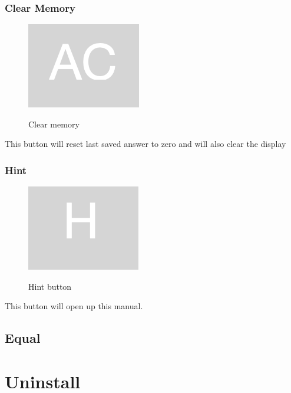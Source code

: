 \documentclass[11pt, a4paper]{article}
\begin{document}
    \subsubsection{Clear Memory}
    \label{subsubsec:clearmemory}

    \begin{figure}[h]
        \caption{Clear memory}
        \includegraphics[scale = 0.2]{clear_memory}
        \centering
        \label{fig:c}
    \end{figure}
    This button will reset last saved answer to zero and will also clear the display

    \subsubsection[scale = 0.2]{Hint}
    \label{subsubsec:hint}


    \begin{figure}[h]
        \caption{Hint button}
        \includegraphics[scale = 0.2]{hint}
        \centering
        \label{fig:h}
    \end{figure}

    This button will open up this manual.

    \newpage

    \subsection{Equal}
    \label{subsec:equal}


    \section{Uninstall}
    \label{sec:uninstall}
\end{document}

